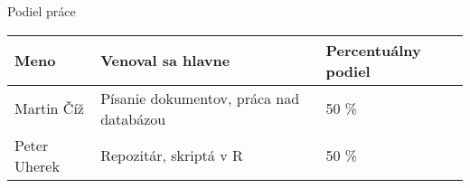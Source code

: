 
\clearpage
{\Large Podiel práce\par}

\vspace{5mm}

\begin{tabular}{|l|l|l|}
  \hline
  \textbf{Meno} & \textbf{Venoval sa hlavne} & \textbf{Percentuálny podiel} \\
  \hline
  Martin Číž & Písanie dokumentov, práca nad databázou & 50 \% \\
  \hline
  Peter Uherek & Repozitár, skriptá v R & 50 \% \\
  \hline
 \end{tabular}
